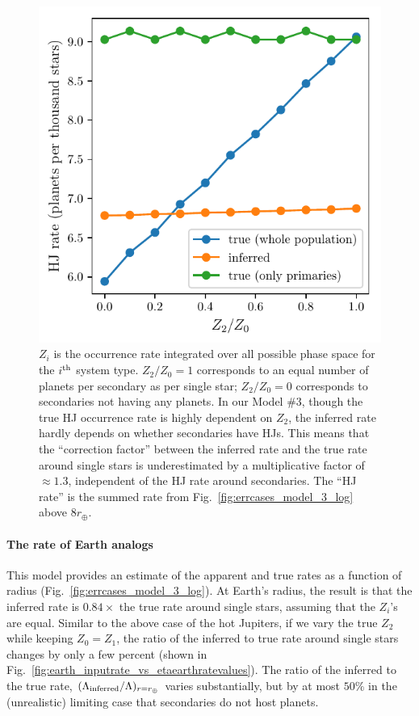 \begin{figure}[!tb]
    \centering
    \includegraphics[width=.6\textwidth]{figures/HJ_correction_inputrate_vs_HJratevalues.pdf}
    \caption{
        $Z_i$ is the occurrence rate integrated over all possible phase 
        space for the $i^{\rm th}$ system type. $Z_2/Z_0=1$ 
        corresponds to an equal number of planets per secondary as per single 
        star;
        $Z_2/Z_0=0$ corresponds to secondaries not having any 
        planets.
        In our Model \#3, though the true HJ occurrence rate 
        is highly dependent on $Z_2$, 
        the inferred rate hardly depends on whether secondaries have HJs.
        This means that the ``correction factor'' between the inferred rate 
        and the true rate around single stars is underestimated by a 
        multiplicative 
        factor of $\approx1.3$, independent of the HJ rate around secondaries.
        The ``HJ rate'' is the summed rate from     
        Fig.~\ref{fig:errcases_model_3_log} above $8r_\oplus$.
    }
    \label{fig:HJ_correction_inputrate_vs_HJratevalues}
\end{figure}


\paragraph{The rate of Earth analogs}
This model provides an estimate of the apparent and true 
rates as a function of radius (Fig.~\ref{fig:errcases_model_3_log}).
At Earth's radius, the result is that the inferred rate is $0.84\times$ the 
true rate around single stars, assuming that the $Z_i$'s are equal.
Similar to the above case of the hot Jupiters, if we vary the true $Z_2$ 
while keeping $Z_0 = Z_1$, the ratio of the inferred to true rate 
around single stars changes by only a few percent (shown in 
Fig.~\ref{fig:earth_inputrate_vs_etaearthratevalues}).
The ratio of the inferred to the true rate, $(\Lambda_{\rm 
    inferred}/\Lambda)_{r=r_\oplus}$ varies substantially, but by at most 
    $50\%$ 
in the (unrealistic) limiting case that secondaries do not host planets.


